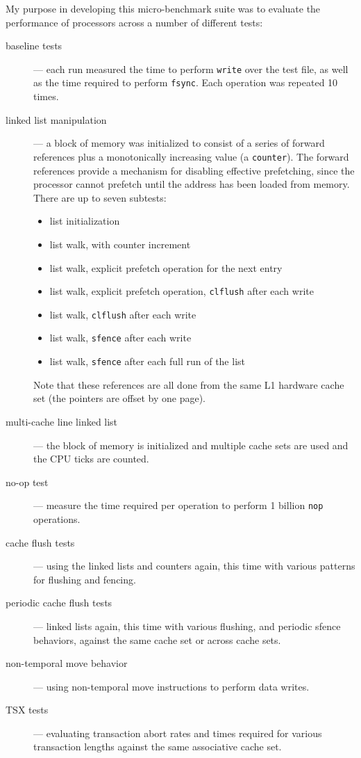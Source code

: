 My purpose in developing this micro-benchmark suite was to evaluate the performance of processors across a number of different tests:

\begin{description}
\item[baseline tests] --- each run measured the time to perform \texttt{write} over the test file, as well as the time required to perform \texttt{fsync}.  Each operation was repeated 10 times.
\item[linked list manipulation] --- a block of memory was initialized to consist of a series of forward references plus a monotonically increasing value (a \texttt{counter}).  The forward references provide a mechanism for disabling effective prefetching, since the processor cannot prefetch until the address has been loaded from memory. There are up to seven subtests:
\begin{itemize}
    \item list initialization
    \item list walk, with counter increment
    \item list walk, explicit prefetch operation for the next entry
    \item list walk, explicit prefetch operation, \texttt{clflush} after each write
    \item list walk, \texttt{clflush} after each write
    \item list walk, \texttt{sfence} after each write
    \item list walk, \texttt{sfence} after each full run of the list
\end{itemize}
Note that these references are all done from the same L1 hardware cache set  (the pointers are offset by one page).
\item[multi-cache line linked list] --- the block of memory is initialized and multiple cache sets are used and the CPU ticks are counted. 
\item[no-op test] --- measure the time required per operation to perform 1 billion \texttt{nop} operations.
\item[cache flush tests] --- using the linked lists and counters again, this time with various patterns for flushing and fencing.
\item[periodic cache flush tests] --- linked lists again, this time with various flushing, and periodic sfence behaviors, against the same cache set or across cache sets.
\item[non-temporal move behavior] --- using non-temporal move instructions to perform data writes.
\item[TSX tests] --- evaluating transaction abort rates and times required for various transaction lengths against the same associative cache set.  
\end{description}

